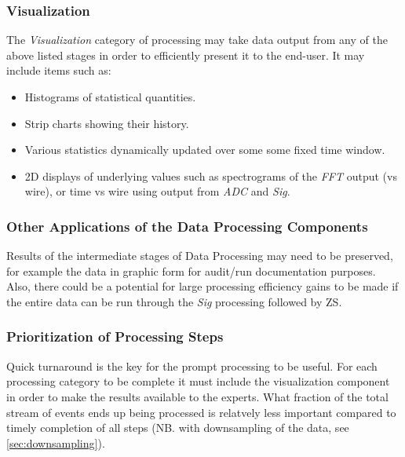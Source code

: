 \documentclass[pdftex,12pt,letter]{article}
\begin{document}
\subsubsection{Visualization}
The \textit{Visualization} category of processing
 may take data output from any of the above listed stages in
order to efficiently present it to the end-user. 
It may include items such as:

\begin{itemize}

\item Histograms of statistical quantities.

\item Strip charts showing their history.

\item Various statistics dynamically updated over some some fixed time window.

\item 2D displays of underlying values such as spectrograms of the \textit{FFT}
  output (vs wire), or time vs wire using output from \textit{ADC} and \textit{Sig}.

\end{itemize}

\subsubsection{Other Applications of the Data Processing Components}
Results of the intermediate stages of Data Processing may need to be preserved, for
example the data in graphic form for audit/run documentation purposes.
Also, there could be a potential for large processing efficiency
gains to be made if the entire data can be run through the \textit{Sig} processing followed by ZS.

\subsubsection{Prioritization of Processing Steps}
Quick turnaround is the key for the prompt processing to be useful. For each processing category
to be complete it must include the visualization component in order to make the results available
to the experts. What fraction of the total stream of events ends up being processed is relatvely less
important compared to timely completion of all steps (NB. with downsampling of the data, see 
\ref{sec:downsampling}).
\end{document}
